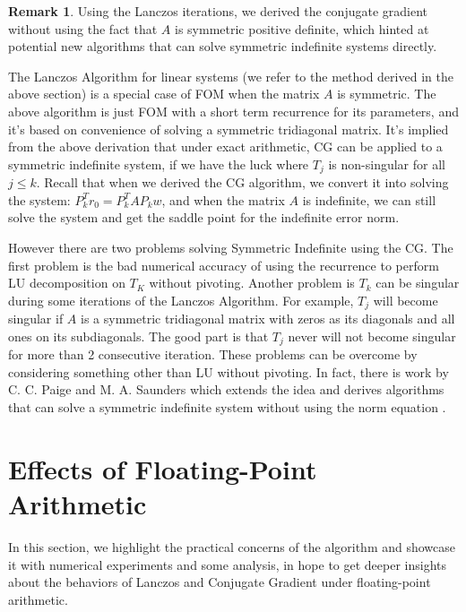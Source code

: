 \documentclass[]{article}
\theoremstyle{definition}
\newtheorem{remark}{Remark}[subsection]  %
\begin{document}
            \begin{remark}
                Using the Lanczos iterations, we derived the conjugate gradient without using the fact that $A$ is symmetric positive definite, which hinted at potential new algorithms that can solve symmetric indefinite systems directly. 
                \par
                The Lanczos Algorithm for linear systems (we refer to the method derived in the above section) is a special case of FOM \cite{paper:FOM} when the matrix $A$ is symmetric. The above algorithm is just FOM with a short term recurrence for its parameters, and it's based on convenience of solving a symmetric tridiagonal matrix. It's implied from the above derivation that under exact arithmetic, CG can be applied to a symmetric indefinite system, if we have the luck where $T_j$ is non-singular for all $j\le k$. Recall that when we derived the CG algorithm, we convert it into solving the system: $P^T_kr_0 = P_k^TAP_kw$, and when the matrix $A$ is indefinite, we can still solve the system and get the saddle point for the indefinite error norm. 
                \par
                However there are two problems solving Symmetric Indefinite using the CG. The first problem is the bad numerical accuracy of using the recurrence to perform LU decomposition on $T_K$ without pivoting. Another problem is $T_k$ can be singular during some iterations of the Lanczos Algorithm. For example, $T_j$ will become singular if $A$ is a symmetric tridiagonal matrix with zeros as its diagonals and all ones on its subdiagonals. The good part is that $T_j$ never will not become singular for more than 2 consecutive iteration\cite{paper:greenbaum_indefinite_lanczos}. These problems can be overcome by considering something other than LU without pivoting. In fact, there is work by C. C. Paige and M. A. Saunders which extends the idea and derives algorithms that can solve a symmetric indefinite system without using the norm equation \cite{paper:SYMLQ}. 
            \end{remark}
        
\section{Effects of Floating-Point Arithmetic}
    In this section, we highlight the practical concerns of the algorithm and showcase it with numerical experiments and some analysis, in hope to get deeper insights about the behaviors of Lanczos and Conjugate Gradient under floating-point arithmetic. 
\end{document}
